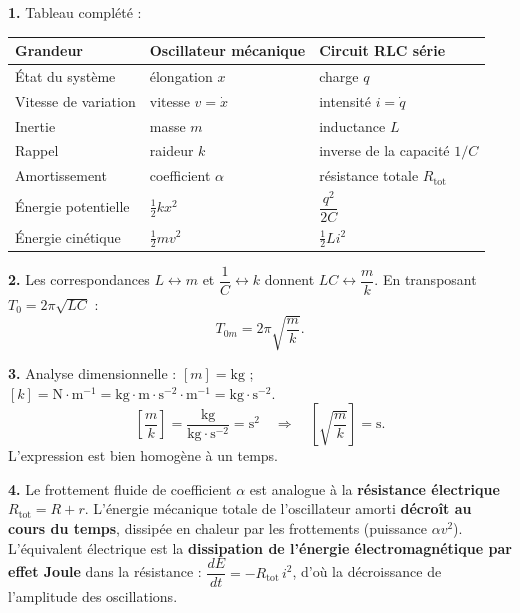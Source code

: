 \documentclass[11pt]{article}
\begin{document}
\begin{corrige}
\textbf{1.} Tableau complété :
\begin{center}
\begin{tabularx}{\linewidth}{|l|X|X|}
\hline
\rowcolor{popblueL} \textbf{Grandeur} & \textbf{Oscillateur mécanique} & \textbf{Circuit RLC série} \\
\hline
État du système & élongation $x$ & charge $q$ \\
\hline
Vitesse de variation & vitesse $v = \dot{x}$ & intensité $i = \dot{q}$ \\
\hline
Inertie & masse $m$ & inductance $L$ \\
\hline
Rappel & raideur $k$ & inverse de la capacité $1/C$ \\
\hline
Amortissement & coefficient $\alpha$ & résistance totale $R_{\text{tot}}$ \\
\hline
Énergie potentielle & $\frac{1}{2}kx^2$ & $\dfrac{q^2}{2C}$ \\
\hline
Énergie cinétique & $\frac{1}{2}mv^2$ & $\frac{1}{2}Li^2$ \\
\hline
\end{tabularx}
\end{center}

\textbf{2.} Les correspondances $L \leftrightarrow m$ et $\dfrac{1}{C} \leftrightarrow k$ donnent $LC \leftrightarrow \dfrac{m}{k}$. En transposant $T_0 = 2\pi\sqrt{LC}$ :
\[
T_{0m} = 2\pi\sqrt{\frac{m}{k}}.
\]

\textbf{3.} Analyse dimensionnelle : $[m] = \text{kg}$ ; $[k] = \text{N}\cdot\text{m}^{-1} = \text{kg}\cdot\text{m}\cdot\text{s}^{-2}\cdot\text{m}^{-1} = \text{kg}\cdot\text{s}^{-2}$.
\[
\left[\frac{m}{k}\right] = \frac{\text{kg}}{\text{kg}\cdot\text{s}^{-2}} = \text{s}^2
\quad\Rightarrow\quad
\left[\sqrt{\frac{m}{k}}\right] = \text{s}.
\]
L'expression est bien homogène à un temps.

\textbf{4.} Le frottement fluide de coefficient $\alpha$ est analogue à la \textbf{résistance électrique} $R_{\text{tot}} = R + r$. L'énergie mécanique totale de l'oscillateur amorti \textbf{décroît au cours du temps}, dissipée en chaleur par les frottements (puissance $\alpha v^2$). L'équivalent électrique est la \textbf{dissipation de l'énergie électromagnétique par effet Joule} dans la résistance : $\dfrac{dE}{dt} = -R_{\text{tot}}\,i^2$, d'où la décroissance de l'amplitude des oscillations.
\end{corrige}
\end{document}
